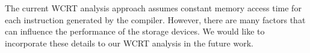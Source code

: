 The current WCRT analysis approach assumes constant memory access time
for each instruction generated by the compiler. However, there are many
factors
\cite{Zhang:2014:DCR:2593069.2593124,Qin:2010:DBA:1878961.1878991,Chen:2013:DDH:2555692.2555699}
that can influence the performance of the storage devices. We would like
to incorporate these details to our WCRT analysis in the future work.






